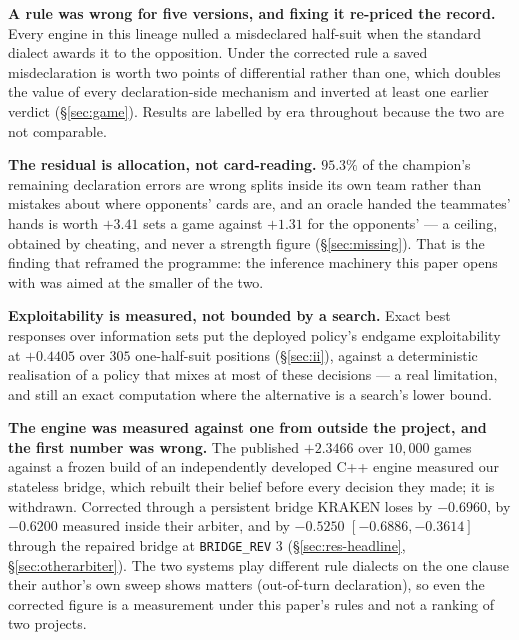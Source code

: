 \documentclass[11pt,letterpaper]{article}
\begin{document}
\textbf{A rule was wrong for five versions, and fixing it re-priced the
record.} Every engine in this lineage nulled a misdeclared half-suit when the
standard dialect awards it to the opposition. Under the corrected rule a saved
misdeclaration is worth two points of differential rather than one, which
doubles the value of every declaration-side mechanism and inverted at least one
earlier verdict (\S\ref{sec:game}). Results are labelled by era throughout
because the two are not comparable.

\textbf{The residual is allocation, not card-reading.} $95.3\%$ of the
champion's remaining declaration errors are wrong splits inside its own team
rather than mistakes about where opponents' cards are, and an oracle handed the
teammates' hands is worth $+3.41$ sets a game against $+1.31$ for the
opponents' --- a ceiling, obtained by cheating, and never a strength figure
(\S\ref{sec:missing}). That is the finding that reframed the programme: the
inference machinery this paper opens with was aimed at the smaller of the two.

\textbf{Exploitability is measured, not bounded by a search.} Exact best
responses over information sets put the deployed policy's endgame
exploitability at $+0.4405$ over $305$ one-half-suit positions
(\S\ref{sec:ii}), against a deterministic realisation of a policy that mixes
at most of these decisions --- a real limitation, and still an exact
computation where the alternative is a search's lower bound.

\textbf{The engine was measured against one from outside the project, and
the first number was wrong.} The published $+2.3466$ over $10{,}000$ games
against a frozen build of an independently developed C++ engine
measured our stateless bridge, which rebuilt their
belief before every decision they made; it is withdrawn. Corrected through a
persistent bridge KRAKEN loses by $-0.6960$, by $-0.6200$ measured inside
their arbiter, and by $-0.5250$ $[-0.6886, -0.3614]$ through the repaired
bridge at \texttt{BRIDGE\_REV} 3 (\S\ref{sec:res-headline},
\S\ref{sec:otherarbiter}). The two systems play different rule dialects on
the one clause their author's own sweep shows matters (out-of-turn
declaration), so even the corrected figure is a measurement under this
paper's rules and not a ranking of two projects.
\end{document}
